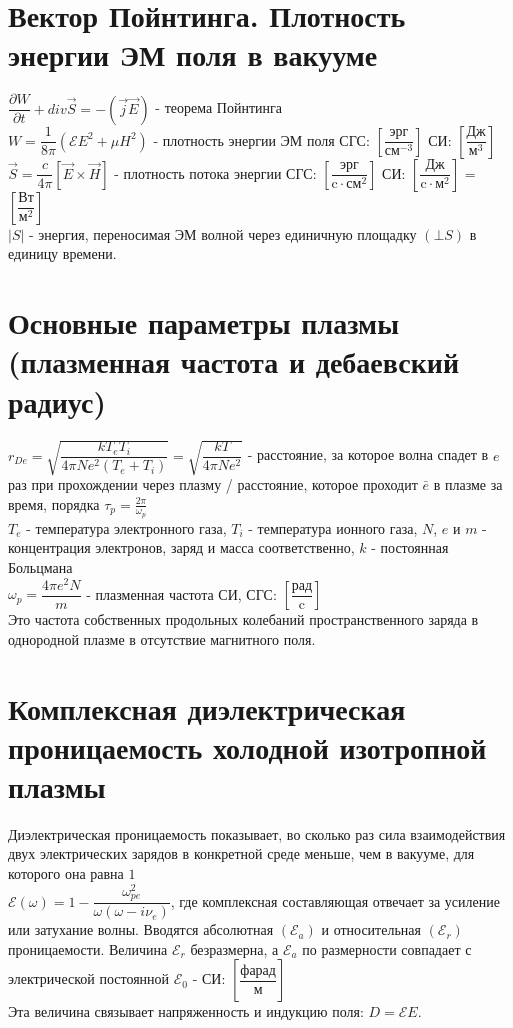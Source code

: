 \begin{multicols*}{2}
		\section{Вектор Пойнтинга. Плотность энергии ЭМ поля в вакууме}
		$\dfrac{\partial W}{\partial t} + div \vec{S} = - (\vec{j}  \vec{E})$ - теорема Пойнтинга\\
		$W = \dfrac{1}{8\pi} (\mathcal{E}E^2 + \mu H^2)$ - плотность энергии ЭМ поля \quad СГС: $\left[\dfrac{\text{эрг}}{\text{см}^{-3}}\right]$ \quad СИ: $\left[\dfrac{\text{Дж}}{\text{м}^3}\right]$\\
		$\vec{S} = \dfrac{c}{4\pi} \left[\vec{E}\times \vec{H}\right]$ - плотность потока энергии \quad СГС: $\left[\dfrac{\text{эрг}}{\text{c}\cdot\text{см}^2}\right]$ \quad СИ: $\left[\dfrac{\text{Дж}}{\text{c}\cdot \text{м}^2}\right]$ = $\left[\dfrac{\text{Вт}}{\text{м}^2}\right]$\\
		$\left\lvert S\right\rvert$ - энергия, переносимая ЭМ волной через единичную площадку $(\bot S)$ в единицу времени.

		\section{Основные параметры плазмы (плазменная частота и дебаевский радиус)}
		$r_{De} = \sqrt{\dfrac{k T_e T_i}{4\pi N e^2(T_e + T_i)}} = \sqrt{\dfrac{k T}{4\pi N e^2}}$ - расстояние, за которое волна спадет в $e$ раз при прохождении через плазму / расстояние, которое проходит $\bar{e}$ в плазме за время, порядка $\tau_p = \frac{2\pi}{\omega_p}$\\
		$T_e$ - температура электронного газа, $T_i$ - температура ионного газа, $N$, $e$ и $m$ - концентрация электронов, заряд и масса соответственно, $k$ - постоянная Больцмана\\
		$\omega_p = \dfrac{4\pi e^2 N}{m}$ - плазменная частота \quad СИ, СГС: $\left[\dfrac{\text{рад}}{\text{c}}\right]$\\
		Это частота собственных продольных колебаний пространственного заряда в однородной плазме в отсутствие магнитного поля.

		\section{Комплексная диэлектрическая проницаемость холодной изотропной плазмы}
		Диэлектрическая проницаемость показывает, во сколько раз сила взаимодействия двух электрических зарядов в конкретной среде меньше, чем в вакууме, для которого она равна $1$\\
		$\mathcal{E} (\omega) = 1 - \dfrac{\omega_{pe}^2}{\omega(\omega - i\nu_e)}$, где комплексная составляющая отвечает за усиление или затухание волны.
		Вводятся абсолютная $(\mathcal{E}_a)$ и относительная $(\mathcal{E}_r)$ проницаемости. Величина $\mathcal{E} _{r}$ безразмерна, а ${\displaystyle \mathcal{E} _{a}}$ по размерности совпадает с электрической постоянной $\mathcal{E}_{0}$ - СИ: $\left[\dfrac{\text{фарад}}{\text{м}}\right]$\\
		Эта величина связывает напряженность и индукцию поля: $D = \mathcal{E} E $.


	\end{multicols*}

